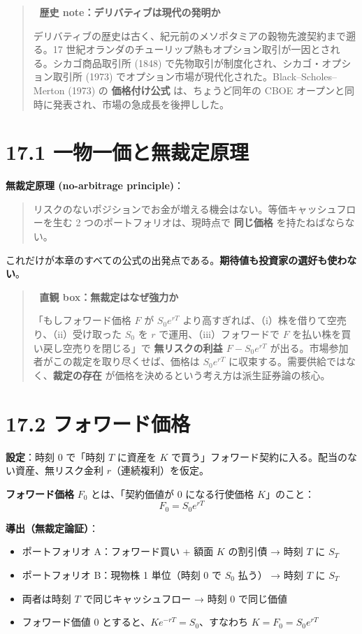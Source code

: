 \documentclass[11pt,a4paper]{report}
\begin{document}
\begin{quote}
📜 \textbf{歴史 note：デリバティブは現代の発明か}

デリバティブの歴史は古く、紀元前のメソポタミアの穀物先渡契約まで遡る。17 世紀オランダのチューリップ熱もオプション取引が一因とされる。シカゴ商品取引所 (1848) で先物取引が制度化され、シカゴ・オプション取引所 (1973) でオプション市場が現代化された。Black–Scholes–Merton (1973) の \textbf{価格付け公式} は、ちょうど同年の CBOE オープンと同時に発表され、市場の急成長を後押しした。
\end{quote}

\section{17.1 一物一価と無裁定原理}

\textbf{無裁定原理 (no-arbitrage principle)}：
\begin{quote}
リスクのないポジションでお金が増える機会はない。等価キャッシュフローを生む 2 つのポートフォリオは、現時点で \textbf{同じ価格} を持たねばならない。
\end{quote}

これだけが本章のすべての公式の出発点である。\textbf{期待値も投資家の選好も使わない}。

\begin{quote}
🎯 \textbf{直観 box：無裁定はなぜ強力か}

「もしフォワード価格 $F$ が $S_0 e^{rT}$ より高すぎれば、（i）株を借りて空売り、（ii）受け取った $S_0$ を $r$ で運用、（iii）フォワードで $F$ を払い株を買い戻し空売りを閉じる」で \textbf{無リスクの利益 $F - S_0 e^{rT}$} が出る。市場参加者がこの裁定を取り尽くせば、価格は $S_0 e^{rT}$ に収束する。需要供給ではなく、\textbf{裁定の存在} が価格を決めるという考え方は派生証券論の核心。
\end{quote}

\section{17.2 フォワード価格}

\textbf{設定}：時刻 0 で「時刻 $T$ に資産を $K$ で買う」フォワード契約に入る。配当のない資産、無リスク金利 $r$（連続複利）を仮定。

\textbf{フォワード価格} $F_0$ とは、「契約価値が 0 になる行使価格 $K$」のこと： \[ \boxed{\;F_0 = S_0 e^{rT}\;} \]

\textbf{導出（無裁定論証）}：
\begin{itemize}
\item ポートフォリオ A：フォワード買い + 額面 $K$ の割引債 → 時刻 $T$ に $S_T$
\item ポートフォリオ B：現物株 1 単位（時刻 0 で $S_0$ 払う） → 時刻 $T$ に $S_T$
\item 両者は時刻 $T$ で同じキャッシュフロー → 時刻 0 で同じ価値
\item フォワード価値 0 とすると、$K e^{-rT} = S_0$、すなわち $K = F_0 = S_0 e^{rT}$
\end{itemize}
\end{document}
